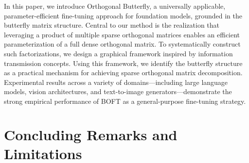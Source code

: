 In this paper, we introduce Orthogonal Butterfly, a universally applicable, parameter-efficient fine-tuning approach for foundation models, grounded in the butterfly matrix structure. Central to our method is the realization that leveraging a product of multiple sparse orthogonal matrices enables an efficient parameterization of a full dense orthogonal matrix. To systematically construct such factorizations, we design a graphical framework inspired by information transmission concepts. Using this framework, we identify the butterfly structure as a practical mechanism for achieving sparse orthogonal matrix decomposition. Experimental results across a variety of domains—including large language models, vision architectures, and text-to-image generators—demonstrate the strong empirical performance of BOFT as a general-purpose fine-tuning strategy.

\section{Concluding Remarks and Limitations}


